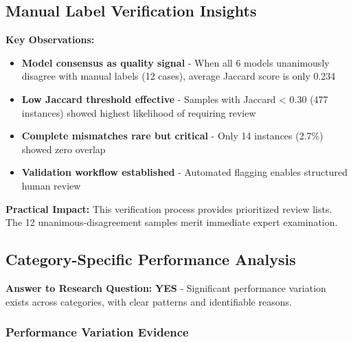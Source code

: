 \documentclass[12pt,a4paper]{article}
\begin{document}
    
    

\subsection{Manual Label Verification Insights}

\textbf{Key Observations:}
\begin{itemize}[leftmargin=*]
    \item \textbf{Model consensus as quality signal} - When all 6 models unanimously disagree with manual labels (12 cases), average Jaccard score is only 0.234
    
    \item \textbf{Low Jaccard threshold effective} - Samples with Jaccard < 0.30 (477 instances) showed highest likelihood of requiring review
    
    \item \textbf{Complete mismatches rare but critical} - Only 14 instances (2.7\%) showed zero overlap
    
    \item \textbf{Validation workflow established} - Automated flagging enables structured human review
\end{itemize}

\textbf{Practical Impact:} This verification process provides prioritized review lists. The 12 unanimous-disagreement samples merit immediate expert examination.

\subsection{Category-Specific Performance Analysis}

\textbf{Answer to Research Question:} \textbf{YES} - Significant performance variation exists across categories, with clear patterns and identifiable reasons.

\subsubsection{Performance Variation Evidence}
\end{document}
